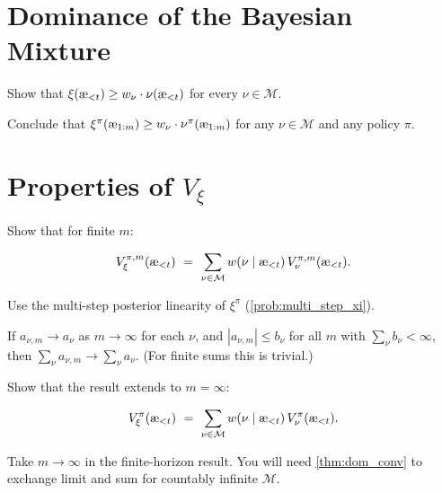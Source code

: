 \documentclass[fontsize=11pt, parskip=half]{scrartcl}
\newcommand{\cM}{\mathcal{M}}
\newcommand{\aes}{\textnormal{\ae}}
\begin{document}

\section{Dominance of the Bayesian Mixture}\label{prob:dominance}

\begin{exercise}
\label{prob:auto1}
Show that $\xi(\aes_{<t}) \geq w_\nu \cdot \nu(\aes_{<t})$ for every $\nu \in \cM$.

\end{exercise}


\begin{exercise}
\label{prob:auto2}
Conclude that $\xi^\pi(\aes_{1:m}) \geq w_\nu \cdot \nu^\pi(\aes_{1:m})$ for any $\nu \in \cM$ and any policy $\pi$.

\end{exercise}



\section[Properties of the Value Function]{Properties of $V_\xi$}\label{prob:linearity}

\begin{exercise}
\label{prob:linearity_finite}
Show that for finite $m$:

\[
    V_\xi^{\pi,m}(\aes_{<t})
    ~=~ \sum_{\nu \in \cM} w(\nu \mid \aes_{<t})\, V_\nu^{\pi,m}(\aes_{<t}).
\]

\begin{hint}
Use the multi-step posterior linearity of $\xi^\pi$ (\cref{prob:multi_step_xi}).
\end{hint}
\end{exercise}


\begin{fact}\label{thm:dom_conv}
If $a_{\nu,m} \to a_\nu$ as $m \to \infty$ for each $\nu$, and $|a_{\nu,m}| \leq b_\nu$ for all $m$ with $\sum_\nu b_\nu < \infty$, then $\sum_\nu a_{\nu,m} \to \sum_\nu a_\nu$.
(For finite sums this is trivial.)
\end{fact}

\begin{exercise}
\label{prob:linearity_inf}
\skippable
Show that the result extends to $m = \infty$:

\[
    V_\xi^\pi(\aes_{<t})
    ~=~ \sum_{\nu \in \cM} w(\nu \mid \aes_{<t})\, V_\nu^\pi(\aes_{<t}).
\]

\begin{hint}
Take $m \to \infty$ in the finite-horizon result. You will need \cref{thm:dom_conv} to exchange limit and sum
for countably infinite $\cM$.
\end{hint}
\end{exercise}
\end{document}
